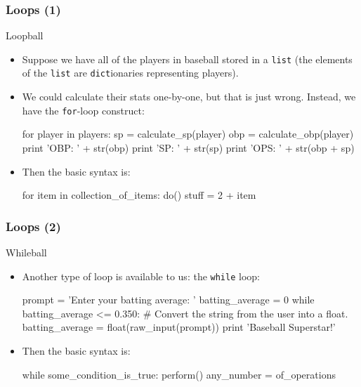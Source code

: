 \documentclass[10pt]{beamer}
\begin{document}
\begin{frame}[fragile]
  \frametitle{Loops (1)}
  \begin{block}{Loopball}
    \begin{itemize}
      \item Suppose we have all of the players in baseball stored in a \texttt{list} (the elements of the \texttt{list} are \texttt{dict}ionaries representing players).
      \item We could calculate their stats one-by-one, but that is just wrong.
        Instead, we have the \texttt{for}-loop construct:
        \begin{pythoncode}
  for player in players:
    sp = calculate_sp(player)
    obp = calculate_obp(player)
    print 'OBP: ' + str(obp)
    print 'SP: ' + str(sp)
    print 'OPS: ' + str(obp + sp)
        \end{pythoncode}
      \item Then the basic syntax is:
      \begin{pythoncode}
  for item in collection_of_items:
    do()
    stuff = 2 + item
      \end{pythoncode}
    \end{itemize}
  \end{block}
\end{frame}

\begin{frame}[fragile]
  \frametitle{Loops (2)}
  \begin{block}{Whileball}
    \begin{itemize}
      \item Another type of loop is available to us: the \texttt{while} loop:
        \begin{pythoncode}
  prompt = 'Enter your batting average: '
  batting_average = 0
  while batting_average <= 0.350:
    # Convert the string from the user into a float.
    batting_average = float(raw_input(prompt))
  print 'Baseball Superstar!'
        \end{pythoncode}
      \item Then the basic syntax is:
        \begin{pythoncode}
  while some_condition_is_true:
    perform()
    any_number = of_operations
        \end{pythoncode}
    \end{itemize}
  \end{block}
\end{frame}
\end{document}
